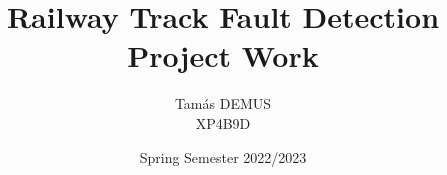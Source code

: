 \documentclass{article}
\title{Railway Track Fault Detection\\\large Project Work\\}
\author{Tamás DEMUS\\XP4B9D}
\date{Spring Semester 2022/2023}
\begin{document}


\pagebreak

\pagebreak
\tableofcontents
\pagebreak







\pagebreak
\listoffigures
\pagebreak
\listoftables
\pagebreak
\printbibliography
\end{document}
